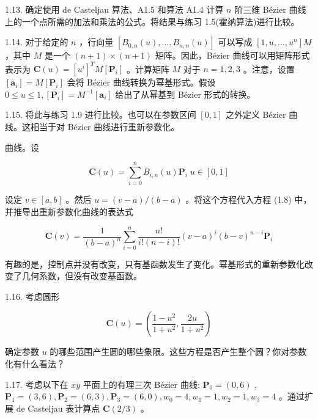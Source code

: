 \documentclass[../main.tex]{subfiles}
\begin{document}
1.13. 确定使用 de Casteljau 算法、A1.5 和算法 A1.4 计算 \(n\) 阶三维 Bézier 曲线上的一个点所需的加法和乘法的公式。将结果与练习 1.5(霍纳算法)进行比较。

1.14. 对于给定的 \(n\) ，行向量 \(\left\lbrack  {{B}_{0,n}\left( u\right) ,\ldots ,{B}_{n,n}\left( u\right) }\right\rbrack\) 可以写成 \(\left\lbrack  {1,u,\ldots ,{u}^{n}}\right\rbrack  M\) ，其中 \(M\) 是一个 \(\left( {n + 1}\right)  \times  \left( {n + 1}\right)\) 矩阵。因此，Bézier 曲线可以用矩阵形式表示为 \(\mathbf{C}\left( u\right)  = {\left\lbrack  {u}^{i}\right\rbrack  }^{T}M\left\lbrack  {\mathbf{P}}_{i}\right\rbrack\) 。计算矩阵 \(M\) 对于 \(n = 1,2,3\) 。注意，设置 \(\left\lbrack  {\mathbf{a}}_{i}\right\rbrack   = M\left\lbrack  {\mathbf{P}}_{i}\right\rbrack\) 会将 Bézier 曲线转换为幂基形式。假设 \(0 \leq  u \leq  1,\left\lbrack  {\mathbf{P}}_{i}\right\rbrack   = {M}^{-1}\left\lbrack  {\mathbf{a}}_{i}\right\rbrack\) 给出了从幂基到 Bézier 形式的转换。

1.15. 将此与练习 1.9 进行比较。也可以在参数区间 \(\left\lbrack  {0,1}\right\rbrack\) 之外定义 Bézier 曲线。这相当于对 Bézier 曲线进行重新参数化。

曲线。设

\[
\mathbf{C}\left( u\right)  = \mathop{\sum }\limits_{{i = 0}}^{n}{B}_{i,n}\left( u\right) {\mathbf{P}}_{i}\;u \in  \left\lbrack  {0,1}\right\rbrack
\]

设定 \(v \in  \left\lbrack  {a,b}\right\rbrack\) 。然后 \(u = \left( {v - a}\right) /\left( {b - a}\right)\) 。将这个方程代入方程 (1.8) 中，并推导出重新参数化曲线的表达式

\[
\mathbf{C}\left( v\right)  = \frac{1}{{\left( b - a\right) }^{n}}\mathop{\sum }\limits_{{i = 0}}^{n}\frac{n!}{i!\left( {n - i}\right) !}{\left( v - a\right) }^{i}{\left( b - v\right) }^{n - i}{\mathbf{P}}_{i}
\]

有趣的是，控制点并没有改变，只有基函数发生了变化。幂基形式的重新参数化改变了几何系数，但没有改变基函数。

1.16. 考虑圆形

\[
\mathbf{C}\left( u\right)  = \left( {\frac{1 - {u}^{2}}{1 + {u}^{2}},\frac{2u}{1 + {u}^{2}}}\right)
\]

确定参数 \(u\) 的哪些范围产生圆的哪些象限。这些方程是否产生整个圆？你对参数化有什么看法？

1.17. 考虑以下在 \({xy}\) 平面上的有理三次 Bézier 曲线: \({\mathbf{P}}_{0} = \left( {0,6}\right)\) , \({\mathbf{P}}_{1} = \left( {3,6}\right) ,{\mathbf{P}}_{2} = \left( {6,3}\right) ,{\mathbf{P}}_{3} = \left( {6,0}\right) ,{w}_{0} = 4,{w}_{1} = 1,{w}_{2} = 1,{w}_{3} = 4\) 。通过扩展 de Casteljau 表计算点 \(\mathbf{C}\left( {2/3}\right)\) 。
\end{document}
